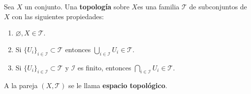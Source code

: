 
\begin{definition}
Sea $X$ un conjunto. Una \textbf{topología} sobre $X$es una familia $\mathcal{T}$ de subconjuntos de $X$ con las siguientes propiedades:
\begin{enumerate}[label=\textnormal{(\roman*)}]
\item $\varnothing, X \in \mathcal{T}$.
\item Si $\{ U_i \}_{i \in \mathcal{I}} \subset \mathcal{T}$ entonces $\bigcup_{i \in \mathcal{I}} U_i \in \mathcal{T}$.
\item Si $\{ U_i \}_{i \in \mathcal{I}} \subset \mathcal{T}$ y $\mathcal{I}$ es finito, entonces $\bigcap_{i \in \mathcal{I}} U_i \in \mathcal{T}$.
\end{enumerate}

A la pareja $(X,\mathcal{T})$ se le llama \textbf{espacio topológico}.
\end{definition}
